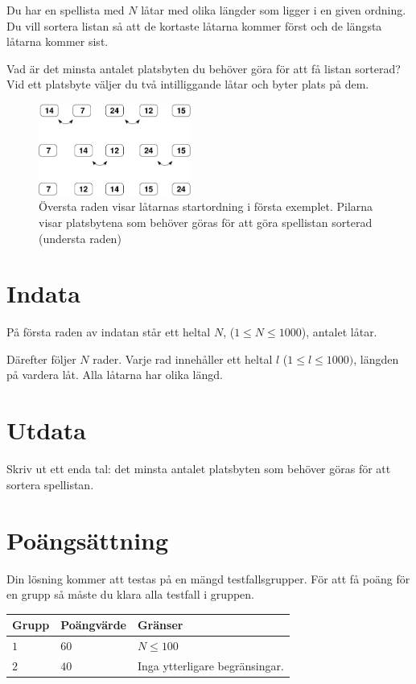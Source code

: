 Du har en spellista med $N$ låtar med olika längder som ligger i en given ordning. Du vill sortera listan så att de kortaste
låtarna kommer först och de längsta låtarna kommer sist.

Vad är det minsta antalet platsbyten du behöver göra för att få listan sorterad?
Vid ett platsbyte väljer du två intilliggande låtar och byter plats på dem.

\begin{figure}[ht!]
\centering
\includegraphics[width=5cm]{sorterafig.pdf}
\caption{Översta raden visar låtarnas startordning i första exemplet. Pilarna visar platsbytena som behöver göras för att göra spellistan sorterad (understa raden)}
\end{figure}

\section*{Indata}
På första raden av indatan står ett heltal $N$, ($1 \leq N \leq 1000$), antalet låtar.

Därefter följer $N$ rader. Varje rad innehåller ett heltal $l$ ($1 \leq l \leq 1000)$, längden på vardera låt.
Alla låtarna har olika längd.

\section*{Utdata}
Skriv ut ett enda tal: det minsta antalet platsbyten som behöver göras för att sortera spellistan.

\section*{Poängsättning}
Din lösning kommer att testas på en mängd testfallsgrupper.
För att få poäng för en grupp så måste du klara alla testfall i gruppen.

\noindent
\begin{tabular}{| l | l | p{12cm} |}
  \hline
  Grupp & Poängvärde & Gränser \\ \hline
  $1$    & $60$        & $N \leq 100$ \\ \hline 
  $2$    & $40$        & Inga ytterligare begränsingar. \\ \hline 
\end{tabular}